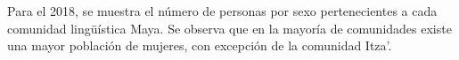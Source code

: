 Para el 2018, se muestra el número de personas por sexo pertenecientes a cada comunidad lingüística Maya. Se observa que en la mayoría de comunidades existe una mayor población de mujeres, con excepción de la comunidad Itza'.  